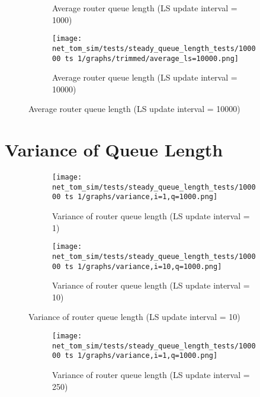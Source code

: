 \begin{appendices}
\begin{figure}[H]
\begin{subfigure}[t]{0.475\textwidth}
            \caption[]{Average router queue length (LS update interval = 1000)}
            \label{fig:avgq-1000}
        \end{subfigure}
        \hfill
        \begin{subfigure}[t]{0.475\textwidth}
            \centering
            \texttt{[image: net\_tom\_sim/tests/steady\_queue\_length\_tests/100000 ts 1/graphs/trimmed/average\_ls=10000.png]}
            \caption[]{Average router queue length (LS update interval = 10000)}
            \label{fig:avgq-10000}
        \end{subfigure}
    \end{figure}
    
\section{Variance of Queue Length}
    \begin{figure}[H]
        \centering
        \begin{subfigure}[b]{0.475\textwidth}
            \centering
            \texttt{[image: net\_tom\_sim/tests/steady\_queue\_length\_tests/100000 ts 1/graphs/variance,i=1,q=1000.png]}
            \caption[]{Variance of router queue length (LS update interval = 1)}
            \label{fig:qvar-1}
        \end{subfigure}
        \hfill
        \begin{subfigure}[b]{0.475\textwidth}
            \centering
            \texttt{[image: net\_tom\_sim/tests/steady\_queue\_length\_tests/100000 ts 1/graphs/variance,i=10,q=1000.png]}
            \caption[]{Variance of router queue length (LS update interval = 10)}
            \label{fig:qvar-10}
        \end{subfigure}
    \end{figure}
    \begin{figure}[H]\ContinuedFloat
        \centering
        \begin{subfigure}[b]{0.475\textwidth}
            \centering
            \texttt{[image: net\_tom\_sim/tests/steady\_queue\_length\_tests/100000 ts 1/graphs/variance,i=1,q=1000.png]}
            \caption[]{Variance of router queue length (LS update interval = 250)}
            \label{fig:qvar-250}
        \end{subfigure}
        \hfill
        \begin{subfigure}[b]{0.475\textwidth}
            \centering

\end{subfigure}
\end{figure}
\end{appendices}
